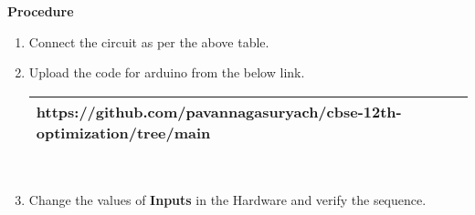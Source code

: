 \documentclass[journal,12pt,twocolumn]{IEEEtran}
\begin{document}
\textbf{Procedure}
\begin{enumerate}[label={\arabic*}.]
	\item Connect the circuit as per the above table.
	\item Upload the code for arduino from the below link.\\

\begin{tabularx}{0.45\textwidth}{
		| >{\centering\arraybackslash}X|}
	\hline
	https://github.com/pavannagasuryach/cbse-12th-optimization/tree/main \\
	\hline
\end{tabularx}\\
	\item Change the values of \textbf{Inputs} in the Hardware and verify the sequence.
\end{enumerate}
\end{document}
